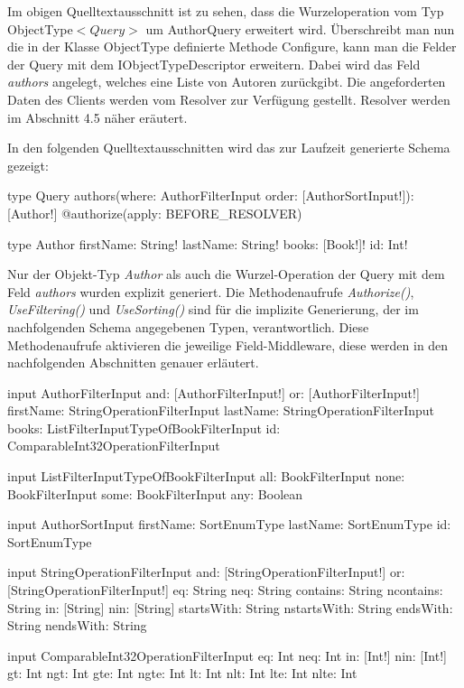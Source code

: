 Im obigen Quelltextausschnitt ist zu sehen, dass die Wurzeloperation vom Typ ObjectType$<Query>$  um AuthorQuery erweitert wird.
Überschreibt man nun die in der Klasse ObjectType definierte Methode Configure, kann man die Felder der Query mit dem IObjectTypeDescriptor erweitern.
Dabei wird das Feld \textit{authors} angelegt, welches eine Liste von Autoren zurückgibt.
Die angeforderten Daten des Clients werden vom Resolver zur Verfügung gestellt.
Resolver werden im Abschnitt 4.5 näher eräutert.
\newline

In den folgenden Quelltextausschnitten wird das zur Laufzeit generierte Schema gezeigt:
\begin{JsCode}
type Query{
    authors(where: AuthorFilterInput order: [AuthorSortInput!]): [Author!] @authorize(apply: BEFORE_RESOLVER)
}

type Author {
    firstName: String!
    lastName: String!
    books: [Book!]!
    id: Int!
}
\end{JsCode}

Nur der Objekt-Typ \textit{Author} als auch die Wurzel-Operation der Query mit dem Feld \textit{authors} wurden explizit generiert.
Die Methodenaufrufe \textit{Authorize()}, \textit{UseFiltering()} und \textit{UseSorting()} sind für die implizite Generierung, der im nachfolgenden Schema angegebenen Typen, verantwortlich.
Diese Methodenaufrufe aktivieren die jeweilige Field-Middleware, diese werden in den nachfolgenden Abschnitten genauer erläutert.

\begin{JsCode}
input AuthorFilterInput {
    and: [AuthorFilterInput!]
    or: [AuthorFilterInput!]
    firstName: StringOperationFilterInput
    lastName: StringOperationFilterInput
    books: ListFilterInputTypeOfBookFilterInput
    id: ComparableInt32OperationFilterInput
}

input ListFilterInputTypeOfBookFilterInput {
  all: BookFilterInput
  none: BookFilterInput
  some: BookFilterInput
  any: Boolean
}

input AuthorSortInput {
    firstName: SortEnumType
    lastName: SortEnumType
    id: SortEnumType
}

input StringOperationFilterInput {
  and: [StringOperationFilterInput!]
  or: [StringOperationFilterInput!]
  eq: String
  neq: String
  contains: String
  ncontains: String
  in: [String]
  nin: [String]
  startsWith: String
  nstartsWith: String
  endsWith: String
  nendsWith: String
}

input ComparableInt32OperationFilterInput {
    eq: Int
    neq: Int
    in: [Int!]
    nin: [Int!]
    gt: Int
    ngt: Int
    gte: Int
    ngte: Int
    lt: Int
    nlt: Int
    lte: Int
    nlte: Int
}
\end{JsCode}

